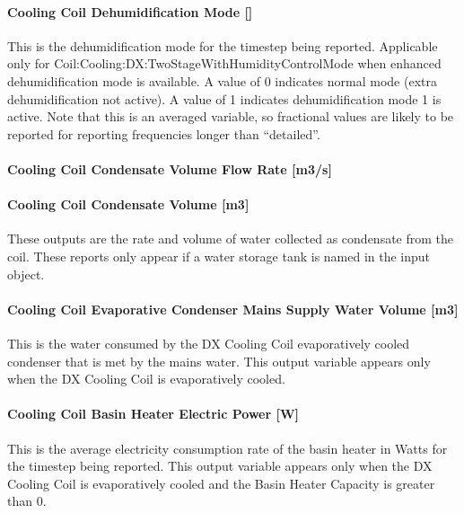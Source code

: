 \paragraph{\texorpdfstring{Cooling Coil Dehumidification Mode {[]}}{Cooling Coil Dehumidification Mode }}\label{cooling-coil-dehumidification-mode}

This is the dehumidification mode for the timestep being reported. Applicable only for Coil:Cooling:DX:TwoStageWithHumidityControlMode when enhanced dehumidification mode is available. A value of 0 indicates normal mode (extra dehumidification not active). A value of 1 indicates dehumidification mode 1 is active. Note that this is an averaged variable, so fractional values are likely to be reported for reporting frequencies longer than ``detailed''.

\paragraph{Cooling Coil Condensate Volume Flow Rate {[}m3/s{]}}\label{cooling-coil-condensate-volume-flow-rate-m3s-4}

\paragraph{Cooling Coil Condensate Volume {[}m3{]}}\label{cooling-coil-condensate-volume-m3-4}

These outputs are the rate and volume of water collected as condensate from the coil. These reports only appear if a water storage tank is named in the input object.

\paragraph{Cooling Coil Evaporative Condenser Mains Supply Water Volume {[}m3{]}}\label{cooling-coil-evaporative-condenser-mains-supply-water-volume-m3-1}

This is the water consumed by the DX Cooling Coil evaporatively cooled condenser that is met by the mains water. This output variable appears only when the DX Cooling Coil is evaporatively cooled.

\paragraph{Cooling Coil Basin Heater Electric Power {[}W{]}}\label{cooling-coil-basin-heater-electric-power-w}

This is the average electricity consumption rate of the basin heater in Watts for the timestep being reported. This output variable appears only when the DX Cooling Coil is evaporatively cooled and the Basin Heater Capacity is greater than 0.

